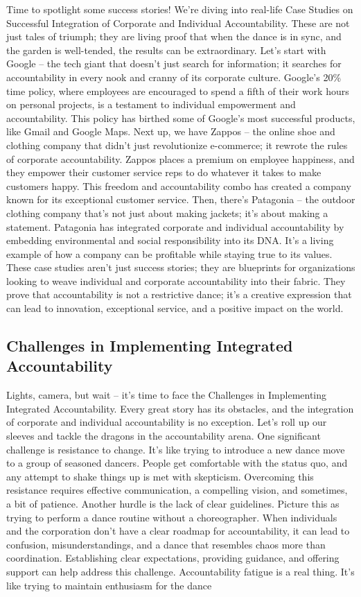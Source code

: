 \documentclass[
  letterpaper,
  DIV=11,
  numbers=noendperiod]{scrreprt}
\begin{document}
Time to spotlight some success stories! We're diving into real-life Case
Studies on Successful Integration of Corporate and Individual
Accountability. These are not just tales of triumph; they are living
proof that when the dance is in sync, and the garden is well-tended, the
results can be extraordinary. Let's start with Google -- the tech giant
that doesn't just search for information; it searches for accountability
in every nook and cranny of its corporate culture. Google's 20\% time
policy, where employees are encouraged to spend a fifth of their work
hours on personal projects, is a testament to individual empowerment and
accountability. This policy has birthed some of Google's most successful
products, like Gmail and Google Maps. Next up, we have Zappos -- the
online shoe and clothing company that didn't just revolutionize
e-commerce; it rewrote the rules of corporate accountability. Zappos
places a premium on employee happiness, and they empower their customer
service reps to do whatever it takes to make customers happy. This
freedom and accountability combo has created a company known for its
exceptional customer service. Then, there's Patagonia -- the outdoor
clothing company that's not just about making jackets; it's about making
a statement. Patagonia has integrated corporate and individual
accountability by embedding environmental and social responsibility into
its DNA. It's a living example of how a company can be profitable while
staying true to its values. These case studies aren't just success
stories; they are blueprints for organizations looking to weave
individual and corporate accountability into their fabric. They prove
that accountability is not a restrictive dance; it's a creative
expression that can lead to innovation, exceptional service, and a
positive impact on the world.

\subsection{Challenges in Implementing Integrated
Accountability}\label{challenges-in-implementing-integrated-accountability}

Lights, camera, but wait -- it's time to face the Challenges in
Implementing Integrated Accountability. Every great story has its
obstacles, and the integration of corporate and individual
accountability is no exception. Let's roll up our sleeves and tackle the
dragons in the accountability arena. One significant challenge is
resistance to change. It's like trying to introduce a new dance move to
a group of seasoned dancers. People get comfortable with the status quo,
and any attempt to shake things up is met with skepticism. Overcoming
this resistance requires effective communication, a compelling vision,
and sometimes, a bit of patience. Another hurdle is the lack of clear
guidelines. Picture this as trying to perform a dance routine without a
choreographer. When individuals and the corporation don't have a clear
roadmap for accountability, it can lead to confusion, misunderstandings,
and a dance that resembles chaos more than coordination. Establishing
clear expectations, providing guidance, and offering support can help
address this challenge. Accountability fatigue is a real thing. It's
like trying to maintain enthusiasm for the dance
\end{document}
